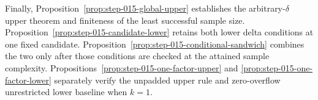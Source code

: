 Finally, Proposition~\ref{prop:step-015-global-upper} establishes the
arbitrary-\(\delta\) upper theorem and finiteness of the least successful
sample size.  Proposition~\ref{prop:step-015-candidate-lower} retains
both lower delta conditions at one fixed candidate.
Proposition~\ref{prop:step-015-conditional-sandwich} combines the two
only after those conditions are checked at the attained sample
complexity.  Propositions~\ref{prop:step-015-one-factor-upper} and
\ref{prop:step-015-one-factor-lower} separately verify the unpadded
upper rule and zero-overflow unrestricted lower baseline when \(k=1\).
